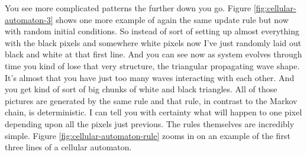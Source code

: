 \documentclass[]{article}
\begin{document}
You see more complicated patterns the further down you go. Figure \ref{fig:cellular-automaton-3} shows one more example of again the same update rule
but now with random initial conditions.
So instead of sort of setting up almost everything with the black pixels
and somewhere white pixels now I've just randomly laid out black and white at that first line.
And you can see now as system evolves through time you kind of lose that very structure, the triangular propagating wave shape.
It's almost that you have just too many waves interacting with each other.
And you get kind of sort of big chunks of white and black triangles.
All of those pictures are generated by the same rule and that rule, in contrast to the Markov chain, is deterministic.
I can tell you with certainty what will happen to one pixel depending upon all the pixels just previous.
The rules themselves are incredibly simple. Figure \ref{fig:cellular-automaton-rule} zooms in on an example of the first three lines
of a cellular automaton. 
\end{document}
